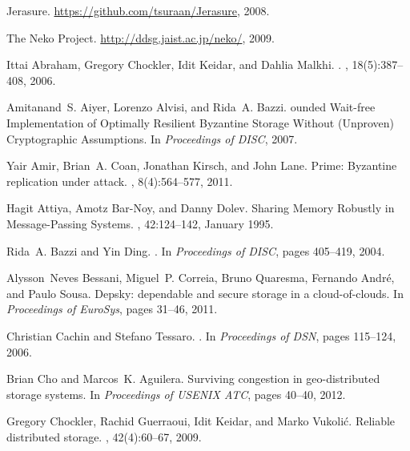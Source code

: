 \documentclass[10pt,conference,compsocconf]{IEEEtran}
\begin{document}
\begin{thebibliography}{10}

{{Jerasure}}.
\newblock \url{https://github.com/tsuraan/Jerasure}, 2008.

{{The Neko Project}}.
\newblock \url{http://ddsg.jaist.ac.jp/neko/}, 2009.

Ittai Abraham, Gregory Chockler, Idit Keidar, and Dahlia Malkhi.
.
, 18(5):387--408, 2006.

Amitanand~S. Aiyer, Lorenzo Alvisi, and Rida~A. Bazzi.
ounded {W}ait-free {I}mplementation of {O}ptimally {R}esilient
  {B}yzantine {S}torage {W}ithout ({U}nproven) {C}ryptographic {A}ssumptions.
\newblock In {\em Proceedings of DISC}, 2007.

Yair Amir, Brian~A. Coan, Jonathan Kirsch, and John Lane.
\newblock Prime: {B}yzantine replication under attack.
, 8(4):564--577, 2011.

Hagit Attiya, Amotz Bar-Noy, and Danny Dolev.
\newblock Sharing {M}emory {R}obustly in {M}essage-{P}assing {S}ystems.
, 42:124--142, January 1995.

Rida~A. Bazzi and Yin Ding.
.
\newblock In {\em Proceedings of DISC}, pages 405--419, 2004.

Alysson~Neves Bessani, Miguel~P. Correia, Bruno Quaresma, Fernando Andr{\'e},
  and Paulo Sousa.
\newblock Depsky: dependable and secure storage in a cloud-of-clouds.
\newblock In {\em Proceedings of EuroSys}, pages 31--46, 2011.

Christian Cachin and Stefano Tessaro.
.
\newblock In {\em Proceedings of DSN}, pages 115--124, 2006.

Brian Cho and Marcos~K. Aguilera.
\newblock Surviving congestion in geo-distributed storage systems.
\newblock In {\em Proceedings of USENIX ATC}, pages 40--40, 2012.

Gregory Chockler, Rachid Guerraoui, Idit Keidar, and Marko Vukoli\'c.
\newblock Reliable distributed storage.
, 42(4):60--67, 2009.


\end{thebibliography}
\end{document}
